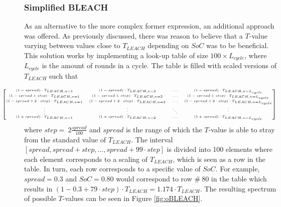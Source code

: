 \subsubsection{Simplified BLEACH}
As an alternative to the more complex former expression, an additional approach was offered.
As previously discussed, there was reason to believe that a $T$-value varying between values close to $T_{LEACH}$ depending on $SoC$ was to be beneficial. This solution works by implementing a look-up table of size $100\times L_{cycle}$, where $L_{cycle}$ is the amount of rounds in a cycle. The table is filled with scaled versions of $T_{LEACH}$ such that

\begin{align}
\hspace{-1.25cm}
\tiny
    \begin{bmatrix}
        (1-spread)\cdot T_{LEACH, n=1} & (1-spread)\cdot T_{LEACH, n=2} &\hdots& (1-spread)\cdot T_{LEACH, n=L_{cycle}} \\
        (1-spread+step)\cdot T_{LEACH, n=1} & (1-spread+step)\cdot T_{LEACH, n=2} &\hdots& (1-spread+step)\cdot T_{LEACH, n=L_{cycle}}\\
        (1-spread+2\cdot step)\cdot T_{LEACH, n=1} & (1-spread + 2\cdot step)\cdot T_{LEACH, n=2} &\hdots& (1-spread +2\cdot step)\cdot T_{LEACH, n=L_{cycle}}\\
        \vdots & \vdots & \ddots & \vdots \\
        (1+spread)\cdot T_{LEACH, n=1} & (1+spread)\cdot T_{LEACH, n=2} &\hdots& (1+spread)\cdot T_{LEACH, n=L_{cycle}}
    \end{bmatrix} 
\end{align}
where $step = \: 2 \frac{spread}{100}$ and $spread$ is the range of which the $T$-value is able to stray from the standard value of $T_{LEACH}$. The interval $[spread, spread+step, \hdots, spread+99\cdot step]$ is divided into 100 elements where each element corresponds to a scaling of $T_{LEACH}$, which is seen as a row in the table. In turn, each row corresponds to a specific value of $SoC$. For example, $spread=0.3$ and $SoC = 0.80$ would correspond to row $\# \: 80$ in the table which results in $(1-0.3+79\cdot step)\cdot T_{LEACH} = 1.174\cdot T_{LEACH}$.
The resulting spectrum of possible $T$-values can be seen in Figure \ref{fig:oBLEACH}.
